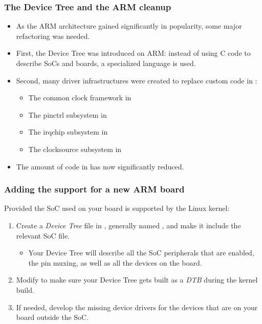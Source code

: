 \begin{frame}
  \frametitle{The Device Tree and the ARM cleanup}
  \begin{itemize}
  \item As the ARM architecture gained significantly in popularity,
    some major refactoring was needed.
  \item First, the Device Tree was introduced on ARM: instead of using
    C code to describe SoCs and boards, a specialized language is
    used.
  \item Second, many driver infrastructures were created to replace
    custom code in :
    \begin{itemize}
    \item The common clock framework in 
    \item The pinctrl subsystem in 
    \item The irqchip subsystem in 
    \item The clocksource subsystem in 
    \end{itemize}
  \item The amount of code in  has now significantly
    reduced.
  \end{itemize}
\end{frame}

\begin{frame}
  \frametitle{Adding the support for a new ARM board}
  Provided the SoC used on your board is supported by the Linux kernel:
  \begin{enumerate}
  \item Create a {\em Device Tree} file in ,
    generally named , and make it
    include the relevant SoC  file.
    \begin{itemize}
    \item Your Device Tree will describe all the SoC peripherals that
      are enabled, the pin muxing, as well as all the devices on the
      board.
    \end{itemize}
  \item Modify  to make sure your
    Device Tree gets built as a {\em DTB} during the kernel build.
  \item If needed, develop the missing device drivers for the devices
    that are on your board outside the SoC.
  \end{enumerate}
\end{frame}

